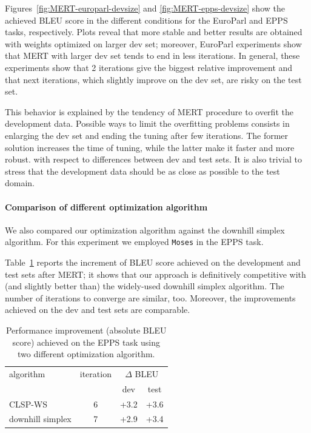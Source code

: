 \documentclass[11pt]{report}
\theoremstyle{plain}
\begin{document}
{Figures~\ref{fig:MERT-europarl-devsize} and \ref{fig:MERT-epps-devsize} show the achieved BLEU score in the different conditions for the EuroParl and EPPS tasks, respectively.  Plots reveal that more stable and better results are obtained with weights optimized on larger dev set; moreover, EuroParl experiments show that MERT with larger dev set tends to end in less iterations.
In general, these experiments show that 2 iterations give the biggest relative  improvement and that next iterations, which slightly improve on the dev set, are risky on the test set.

This behavior is explained by the tendency of MERT procedure to overfit the development data. Possible ways to limit the overfitting problems consists in enlarging the dev set  and ending the tuning after few iterations.
The former solution increases the time of tuning, while the latter make it faster and more robust. with respect to differences between dev and test sets. It is also trivial to stress that the development  data should be as close as possible to the test domain.


\paragraph{Comparison of different optimization algorithm} We also compared our optimization algorithm against the downhill simplex algorithm. For this experiment we employed {\tt Moses} in the EPPS task.

Table~\ref{tbl:MERT-epps-algorithm} reports the increment of BLEU score achieved on the development and test sets after MERT; it shows that our approach is definitively competitive with (and slightly better than) the widely-used downhill simplex algorithm. The number of iterations to converge are similar, too.
Moreover, the improvements achieved on the dev and test sets are comparable.


 \begin{table}[ht]
\begin{center}
\label{tbl:MERT-epps-algorithm}
\begin{tabular}{l|ccc}
algorithm               & iteration & \multicolumn{2}{c}{$\Delta$ BLEU}\\
                                &                & dev & test\\
\hline
CLSP-WS              & 6 & +3.2 & +3.6 \\
downhill simplex  & 7 & +2.9  & +3.4\\
\end{tabular}
\caption{Performance improvement (absolute BLEU score) achieved on the EPPS task using two different optimization algorithm.}
\end{center}
\end{table}

}
\end{document}

